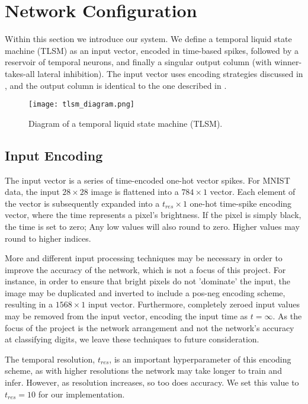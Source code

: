 \section{Network Configuration} \label{sec:Network Configuration}

Within this section we introduce our system. We define a temporal liquid state
machine (TLSM) as an input vector, encoded in time-based spikes, followed by a
reservoir of temporal neurons, and finally a singular output column (with
winner-takes-all lateral inhibition). The input vector uses encoding strategies
discussed in \cite{Encoding}, and the output column is identical to the one
described in \cite{TNN}.

\begin{figure}[h]
    \centering
    \texttt{[image: tlsm\_diagram.png]}
    \caption{Diagram of a temporal liquid state machine (TLSM).}
    \label{fig:tlsm_diagram}
\end{figure}

\subsection{Input Encoding}

The input vector is a series of time-encoded one-hot vector spikes. For MNIST
data, the input $28 \times 28$ image is flattened into a $784 \times 1$ vector.
Each element of the vector is subsequently expanded into a $t_{res} \times 1$
one-hot time-spike encoding vector, where the time represents a pixel's
brightness. If the pixel is simply black, the time is set to zero; Any low
values will also round to zero. Higher values may round to higher indices.

More and different input processing techniques may be necessary in order to
improve the accuracy of the network, which is not a focus of this project. For
instance, in order to ensure that bright pixels do not 'dominate' the input, the
image may be duplicated and inverted to include a pos-neg encoding scheme,
resulting in a $1568 \times 1$ input vector. Furthermore, completely zeroed
input values may be removed from the input vector, encoding the input time as
$t = \infty$. As the focus of the project is the network arrangement and not the
network's accuracy at classifying digits, we leave these techniques to future
consideration.

The temporal resolution, $t_{res}$, is an important hyperparameter of this
encoding scheme, as with higher resolutions the network may take longer to train
and infer. However, as resolution increases, so too does accuracy. We set this
value to $t_{res} = 10$ for our implementation.

